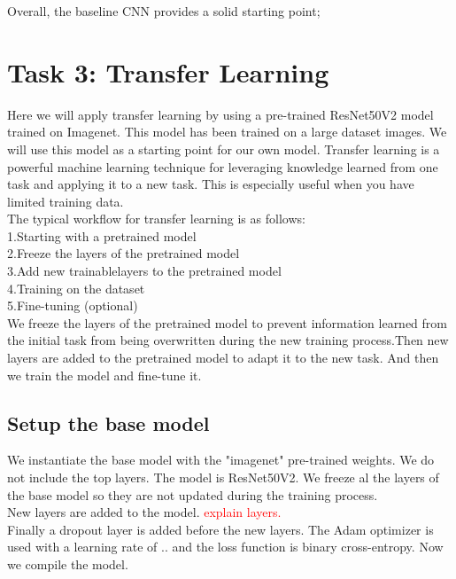 \documentclass[conference]{IEEEtran}
\begin{document}
Overall, the baseline CNN provides a solid starting point;




\section{Task 3: Transfer Learning}
Here we will apply transfer learning by using a pre-trained ResNet50V2 model trained on Imagenet. This model has been trained on a large dataset images. We will use this model as a starting point for our own model. Transfer learning is a powerful machine learning technique for leveraging knowledge learned
from one task and applying it to a new task. This is especially useful when you have limited training data. \\

The typical workflow for transfer learning is as follows: \\
1.Starting with a pretrained model\\
2.Freeze the layers of the pretrained model\\
3.Add new trainablelayers to the pretrained model\\
4.Training on the dataset\\
5.Fine-tuning (optional)\\

We freeze the layers of the pretrained model to prevent information learned from the initial task from being overwritten during the new training process.Then new layers are added to the pretrained model to adapt it to the new task. And then we train the model and fine-tune it.\\

\subsection{Setup the base model}
We instantiate the base model with the "imagenet" pre-trained weights. We do not include the top layers. The model is ResNet50V2. We freeze al the layers of the base model so they are not updated during the training process.\\

New layers are added to the model. \textcolor{red}{explain layers.}\\

Finally a dropout layer is added before the new layers.
The Adam optimizer is used with a learning rate of .. and the loss function is binary cross-entropy.
Now we compile the model. \\
\end{document}
